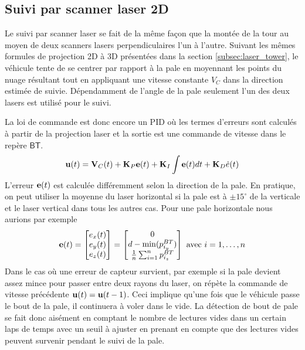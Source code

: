 \subsection{Suivi par scanner laser 2D}
\label{subsec:laser_blade}

Le suivi par scanner laser se fait de la même façon que la montée de la tour au moyen de deux scanners lasers perpendiculaires l'un à l'autre. Suivant les mêmes formules de projection 2D à 3D présentées dans la section \ref{subsec:laser_tower}, le véhicule tente de se centrer par rapport à la pale en moyennant les points du nuage résultant tout en appliquant une vitesse constante $V_C$ dans la direction estimée de suivie. Dépendamment de l'angle de la pale seulement l'un des deux lasers est utilisé pour le suivi.

La loi de commande est donc encore un PID où les termes d'erreurs sont calculés à partir de la projection laser et la sortie est une commande de vitesse dans le repère $\mathsf{BT}$.
\begin{align}
  \mathbf{u}(t) = \mathbf{V}_C(t) + \mathbf{K}_P \mathbf{e}(t) + \mathbf{K}_I\int{\mathbf{e}(t)dt} + \mathbf{K}_D\dot{e}(t)
  \label{eq:pid_laser_blade}
\end{align}
L'erreur $\mathbf{e}(t)$ est calculée différemment selon la direction de la pale. En pratique, on peut utiliser la moyenne du laser horizontal si la pale est à $\pm15^{\circ}$ de la verticale et le laser vertical dans tous les autres cas. Pour une pale horizontale nous aurions par exemple
\[
\mathbf{e}(t) = \begin{bmatrix}e_x(t) \\ e_y(t) \\ e_z(t)\end{bmatrix} =
\begin{bmatrix}
0 \\ d - \min(p^{BT}_{i_y}) \\ \frac{1}{n}\sum_{i=1}^{n}p^{BT}_{i_z}
\end{bmatrix} \text{ avec } i=1,\ldots,n
\]
Dans le cas où une erreur de capteur survient, par exemple si la pale devient assez mince pour passer entre deux rayons du laser, on répète la commande de vitesse précédente $\mathbf{u}(t) = \mathbf{u}(t-1)$. Ceci implique qu'une fois que le véhicule passe le bout de la pale, il continuera à voler dans le vide. La détection de bout de pale se fait donc aisément en comptant le nombre de lectures vides dans un certain laps de temps avec un seuil à ajuster en prenant en compte que des lectures vides peuvent survenir pendant le suivi de la pale.

